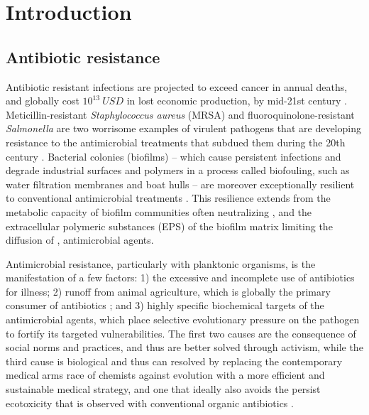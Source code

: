 
\section*{Introduction}

\subsection*{Antibiotic resistance}
Antibiotic resistant infections are projected to exceed cancer in annual deaths, and globally cost $10^{13}~USD$ in lost economic production, by mid-21st century \cite{ONeill2014AntimicrobialNations}. Meticillin-resistant \textit{Staphylococcus aureus} (MRSA) and fluoroquinolone-resistant \textit{Salmonella} \cite{Moghnieh2018EpidemiologyLeague} are two worrisome examples of virulent pathogens that are developing resistance to the antimicrobial treatments that subdued them during the 20th century  \cite{Theuretzbacher2013GlobalStory,Levy2004AntibacterialResponses,Wyles2017Post-treatmentLedipasvir/sofosbuvir,Nowak1997Anti-viralPopulations}. Bacterial colonies (biofilms) -- which cause persistent infections \cite{Metcalf2013BiofilmEvidence} and degrade industrial surfaces  \cite{Matin2011BiofoulingPrevention} and polymers \cite{Cantor1969BiologicalMembranes,Murphy2001MicrobiologicalMembranes} in a process called biofouling, such as water filtration membranes \cite{Ivnitsky2005CharacterizationTreatment,Herzberg2007BiofoulingPressure,Schneider2005DynamicsBiofouling} and boat hulls \cite{Schultz2011EconomicShip} -- are moreover exceptionally resilient to conventional antimicrobial treatments \cite{Jamal2018BacterialInfections,Singhai2012AResistance}. This resilience extends from the metabolic capacity of biofilm communities often neutralizing \cite{Pereira2011SusceptibilityStudy}, and the extracellular polymeric substances (EPS) of the biofilm matrix limiting the diffusion of \cite{Suci1994InvestigationBiofilms,Hoyle1992PseudomonasPiperacillin,LeChevallier1988InactivationBacteria,Dunne1993DiffusionBiofilm}, antimicrobial agents. 

Antimicrobial resistance, particularly with planktonic organisms, is the manifestation of a few factors: 1) the excessive and incomplete use of antibiotics for illness; 2) runoff from animal agriculture, which is globally the primary consumer of antibiotics \cite{VanBoeckel2017ReducingAnimals,Eggleton2020TheWorld}; and 3) highly specific biochemical targets of the antimicrobial agents, which place selective evolutionary pressure on the pathogen to fortify its targeted vulnerabilities. The first two causes are the consequence of social norms and practices, and thus are better solved through activism, while the third cause is biological and thus can resolved by replacing the contemporary medical arms race of chemists against evolution with a more efficient and sustainable medical strategy, and one that ideally also avoids the persist ecotoxicity that is observed with conventional organic antibiotics \cite{Thomas2001AntifoulingEffects,Niu2016RolesIrradiation,Winters1983ControlDesalination}.

